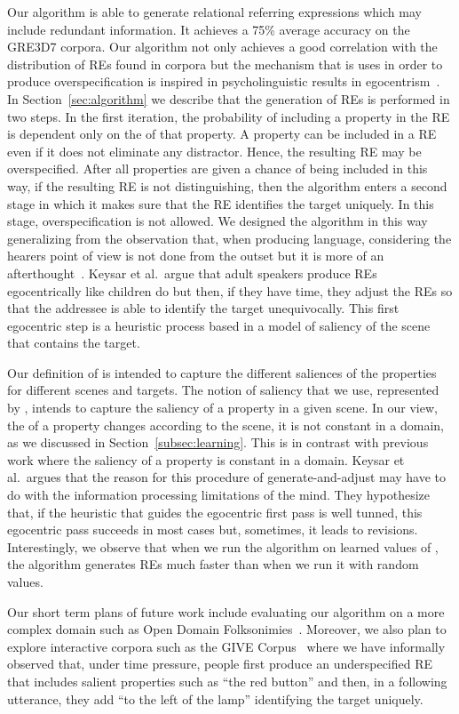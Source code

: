 Our algorithm is able to generate relational referring expressions which may include redundant information. It achieves a 75\% average accuracy on the GRE3D7 corpora. Our algorithm not only achieves a good correlation with the distribution of REs found in corpora but the mechanism that is uses in order to produce overspecification is inspired in psycholinguistic results in egocentrism~\cite{keysar:Curr98}. In Section~\ref{sec:algorithm} we describe that the generation of REs is performed in two steps. In the first iteration, the probability of including a property in the RE is dependent only on the \puse of that property. A property can be included in a RE even if it does not eliminate any distractor. Hence, the resulting RE may be overspecified. After all properties are given a chance of being included in this way, if the resulting RE is not distinguishing, then the algorithm enters a second stage in which it makes sure that the RE identifies the target uniquely. In this stage, overspecification is not allowed. We designed the algorithm in this way generalizing from the observation that, when producing language, considering the hearers point of view is not done from the outset but it is more of an afterthought~\cite{keysar:Curr98}. Keysar et al.~argue that adult speakers produce REs egocentrically like children do but then, if they have time, they adjust the REs so that the addressee is able to identify the target unequivocally. This first egocentric step is a heuristic process based in a model of saliency of the scene that contains the target. 

Our definition of \puse is intended to capture the different saliences of the properties for different scenes and targets. The notion of saliency that we use, represented by \puse, intends to capture the saliency of a property in a given scene. In our view, the \puse of a property changes according to the scene, it is not constant in a domain, as we discussed in Section~\ref{subsec:learning}. This is in contrast with previous work where the saliency of a property is constant in a domain. Keysar et al.~argues that the reason for this procedure of generate-and-adjust may have to do with the information processing limitations of the mind. They hypothesize that, if the heuristic that guides the egocentric first pass is well tunned, this egocentric pass succeeds in most cases but, sometimes, it leads to revisions. Interestingly, we observe that when we run the algorithm on learned values of \puse, the algorithm generates REs much faster than when we run it with random values. 

Our short term plans of future work include evaluating our algorithm on a more complex domain such as Open Domain Folksonimies~\cite{pacheco-duboue-dominguez:2012:NAACL-HLT}. Moreover, we also plan to explore interactive corpora such as the GIVE Corpus~\cite{GarGarKolStr10} where we have informally observed that, under time pressure, people first produce an underspecified RE that includes salient properties such as ``the red button'' and then, in a following utterance, they add ``to the left of the lamp'' identifying the target uniquely. 

